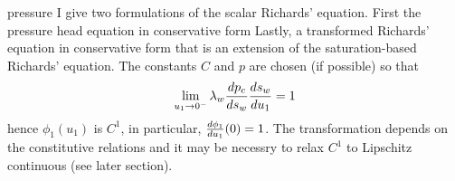 \documentclass[10pt,dvips,twoside,reqno]{amsart}
\begin{document}
pressure 
I give two formulations of the scalar Richards' equation.
First the pressure head equation in conservative form
 Lastly, a transformed Richards' equation in conservative form that is an extension of the saturation-based Richards' equation.
The constants $C$ and $p$ are chosen (if possible) so that
\begin{equation}
\lim_{u_1 \rightarrow 0^{-}}  \lambda_w \frac{d {p_c}}{d {s_w}} \frac{d {s_w}}{d {u_1}} = 1 
\end{equation}
hence $\phi_1(u_1)$ is $C^1$, in particular, $\frac{d {\phi_1}}{d {u_1}}(0) =
1$. The transformation depends on the constitutive relations and it
may be necessry to relax $C^1$ to Lipschitz
continuous (see later section).
\end{document}
